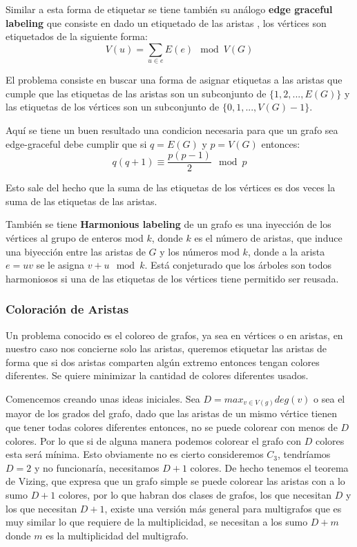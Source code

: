 \documentclass[a4paper]{article}
\begin{document}
Similar a esta forma de etiquetar se tiene tambi\'en su an\'alogo \textbf{edge graceful labeling} que consiste en dado un etiquetado de las aristas , los v\'ertices son etiquetados de la siguiente forma:
$$ V(u) = \sum_{u \in e} E(e) \mod V(G)$$

El problema consiste en buscar una forma de asignar etiquetas a las aristas que cumple que las etiquetas de las aristas son un subconjunto de $\{1,2, ..., E(G)\}$ y las etiquetas de los v\'ertices son un subconjunto de $\{0, 1, ..., V(G)-1\}$.

Aqu\'i se tiene un buen resultado una condicion necesaria para que un grafo sea edge-graceful debe cumplir que si $q = E(G)$ y $p = V(G)$ entonces:
$$q(q+1) \equiv \frac{p(p-1)}{2} \mod p$$

Esto sale del hecho que la suma de las etiquetas de los v\'ertices es dos veces la suma de las etiquetas de las aristas.

Tambi\'en se tiene \textbf{Harmonious labeling} de un grafo es una inyecci\'on de los v\'ertices al grupo de enteros mod  $k$, donde $k$ es el n\'umero de aristas, que induce una biyecci\'on entre las aristas de $G$ y los n\'umeros mod $k$, donde a la arista $e=uv$ se le asigna $v+u \mod k$. Est\'a conjeturado que los \'arboles son todos harmoniosos si una de las etiquetas de los v\'ertices tiene permitido ser reusada.

\subsubsection{Coloraci\'on de Aristas}
 Un problema conocido es el coloreo de grafos, ya sea en v\'ertices o en aristas, en nuestro caso nos concierne solo las aristas, queremos etiquetar las aristas de forma que si dos aristas comparten alg\'un extremo entonces tengan colores diferentes. Se quiere minimizar la cantidad de colores diferentes usados.


 Comencemos creando unas ideas iniciales. Sea $D = max_{v \in V(g)}deg(v)$ o sea el mayor de los grados del grafo, dado que las aristas de un mismo v\'ertice tienen que tener todas colores diferentes entonces, no se puede colorear con menos de $D$ colores. Por lo que si de alguna manera podemos colorear el grafo con $D$ colores esta ser\'a m\'inima. Esto obviamente no es cierto consideremos $C_3$, tendr\'iamos $D = 2$ y no funcionar\'ia, necesitamos $D+1$ colores. De hecho tenemos el teorema de Vizing, que expresa que un grafo simple se puede colorear las aristas con a lo sumo $D + 1$ colores, por lo que habran dos clases de grafos, los que necesitan $D$ y los que necesitan $D+1$, existe una versi\'on m\'as general para multigrafos que es muy similar lo que requiere de la multiplicidad, se necesitan a los sumo $D + m$ donde $m$ es la multiplicidad del multigrafo.
\end{document}
